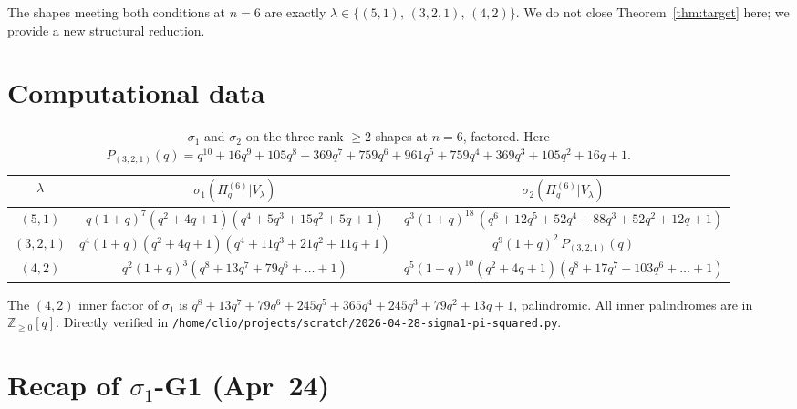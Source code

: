 \documentclass{article}
\theoremstyle{definition}
\begin{document}
The shapes meeting both conditions at $n=6$ are exactly $\lambda \in \{(5,1),\,(3,2,1),\,(4,2)\}$.
We do not close Theorem~\ref{thm:target} here; we provide a new structural reduction.

\section{Computational data}

\begin{table}[h]
\centering
\begin{tabular}{c|c|c}
$\lambda$ & $\sigma_1(\Pi_q^{(6)}|V_\lambda)$ & $\sigma_2(\Pi_q^{(6)}|V_\lambda)$ \\
\hline
$(5,1)$ & $q(1+q)^7 (q^2+4q+1)(q^4+5q^3+15q^2+5q+1)$ & $q^3(1+q)^{18}\,(q^6+12q^5+52q^4+88q^3+52q^2+12q+1)$ \\
$(3,2,1)$ & $q^4(1+q)(q^2+4q+1)(q^4+11q^3+21q^2+11q+1)$ & $q^9(1+q)^2\,P_{(3,2,1)}(q)$ \\
$(4,2)$ & $q^2(1+q)^3(q^8+13q^7+79q^6+\dots+1)$ & $q^5(1+q)^{10}(q^2+4q+1)(q^8+17q^7+103q^6+\dots+1)$ \\
\end{tabular}
\caption{$\sigma_1$ and $\sigma_2$ on the three rank-$\geq 2$ shapes at $n=6$, factored. Here
$P_{(3,2,1)}(q) = q^{10}+16q^9+105q^8+369q^7+759q^6+961q^5+759q^4+369q^3+105q^2+16q+1$.}
\end{table}

The $(4,2)$ inner factor of $\sigma_1$ is
$q^8+13q^7+79q^6+245q^5+365q^4+245q^3+79q^2+13q+1$, palindromic.
All inner palindromes are in $\mathbb{Z}_{\geq 0}[q]$. Directly verified
in \verb|/home/clio/projects/scratch/2026-04-28-sigma1-pi-squared.py|.

\section{Recap of $\sigma_1$-G1 (Apr~24)}
\end{document}
